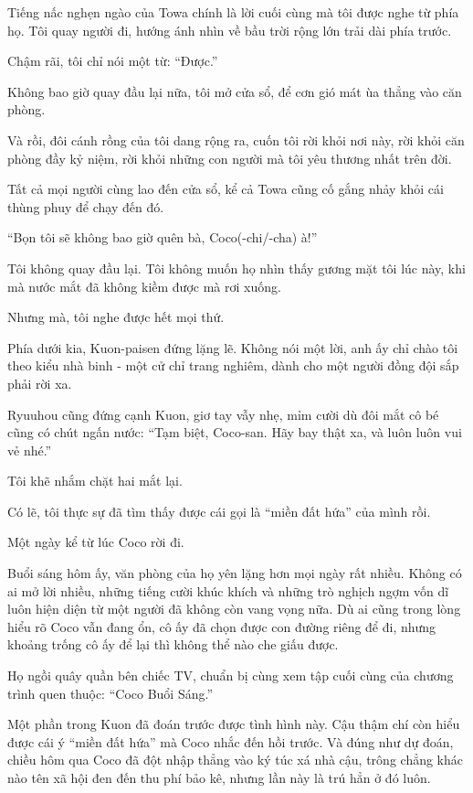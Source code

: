 \documentclass[../main.tex]{subfiles}
\begin{document}
Tiếng nấc nghẹn ngào của Towa chính là lời cuối cùng mà tôi được nghe từ phía họ. Tôi quay người đi, hướng ánh nhìn về bầu trời rộng lớn trải dài phía trước.

Chậm rãi, tôi chỉ nói một từ: ``Được.''

Không bao giờ quay đầu lại nữa, tôi mở cửa sổ, để cơn gió mát ùa thẳng vào căn phòng.

Và rồi, đôi cánh rồng của tôi dang rộng ra, cuốn tôi rời khỏi nơi này, rời khỏi căn phòng đầy kỷ niệm, rời khỏi những con người mà tôi yêu thương nhất trên đời.

Tất cả mọi người cùng lao đến cửa sổ, kể cả Towa cũng cố gắng nhảy khỏi cái thùng phuy để chạy đến đó.

``Bọn tôi sẽ không bao giờ quên bà, Coco(-chi/-cha) à!''


Tôi không quay đầu lại. Tôi không muốn họ nhìn thấy gương mặt tôi lúc này, khi mà nước mắt đã không kiềm được mà rơi xuống.

Nhưng mà, tôi nghe được hết mọi thứ.

Phía dưới kia, Kuon-paisen đứng lặng lẽ. Không nói một lời, anh ấy chỉ chào tôi theo kiểu nhà binh - một cử chỉ trang nghiêm, dành cho một người đồng đội sắp phải rời xa.

Ryuuhou cũng đứng cạnh Kuon, giơ tay vẫy nhẹ, mỉm cười dù đôi mắt cô bé cũng có chút ngấn nước: ``Tạm biệt, Coco-san. Hãy bay thật xa, và luôn luôn vui vẻ nhé.''

Tôi khẽ nhắm chặt hai mắt lại.

Có lẽ, tôi thực sự đã tìm thấy được cái gọi là ``miền đất hứa'' của mình rồi.

\omk

\pov{-}

Một ngày kể từ lúc Coco rời đi.

Buổi sáng hôm ấy, văn phòng của họ yên lặng hơn mọi ngày rất nhiều. Không có ai mở lời nhiều, những tiếng cười khúc khích và những trò nghịch ngợm vốn dĩ luôn hiện diện từ một người đã không còn vang vọng nữa. Dù ai cũng trong lòng hiểu rõ Coco vẫn đang ổn, cô ấy đã chọn được con đường riêng để đi, nhưng khoảng trống cô ấy để lại thì không thể nào che giấu được.

Họ ngồi quây quần bên chiếc TV, chuẩn bị cùng xem tập cuối cùng của chương trình quen thuộc: ``Coco Buổi Sáng.''

Một phần trong Kuon đã đoán trước được tình hình này. Cậu thậm chí còn hiểu được cái ý ``miền đất hứa'' mà Coco nhắc đến hồi trước. Và đúng như dự đoán, chiều hôm qua Coco đã đột nhập thẳng vào ký túc xá nhà cậu, trông chẳng khác nào tên xã hội đen đến thu phí bảo kê, nhưng lần này là trú hẳn ở đó luôn.
\end{document}
